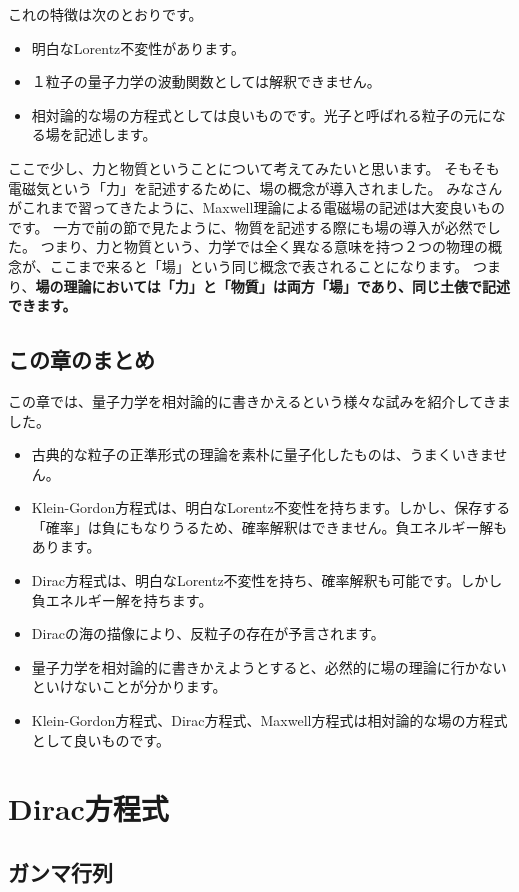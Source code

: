 \documentclass[report,paper=a4, fontsize=12pt, line_length=16cm, number_of_lines=33,dvipdfmx]{jlreq}
\numberwithin{equation}{chapter}
\newcommand{\strong}[1]{{\sffamily \bfseries #1}}
\begin{document}
これの特徴は次のとおりです。
\begin{itemize}
  \item 明白なLorentz不変性があります。
  \item １粒子の量子力学の波動関数としては解釈できません。
  \item 相対論的な場の方程式としては良いものです。光子と呼ばれる粒子の元になる場を記述します。
\end{itemize}

ここで少し、力と物質ということについて考えてみたいと思います。
そもそも電磁気という「力」を記述するために、場の概念が導入されました。
みなさんがこれまで習ってきたように、Maxwell理論による電磁場の記述は大変良いものです。
一方で前の節で見たように、物質を記述する際にも場の導入が必然でした。
つまり、力と物質という、力学では全く異なる意味を持つ２つの物理の概念が、ここまで来ると「場」という同じ概念で表されることになります。
つまり、\strong{場の理論においては「力」と「物質」は両方「場」であり、同じ土俵で記述できます。}


\section{この章のまとめ}
この章では、量子力学を相対論的に書きかえるという様々な試みを紹介してきました。
\begin{itemize}
  \item 古典的な粒子の正準形式の理論を素朴に量子化したものは、うまくいきません。
  \item Klein-Gordon方程式は、明白なLorentz不変性を持ちます。しかし、保存する「確率」は負にもなりうるため、確率解釈はできません。負エネルギー解もあります。
  \item Dirac方程式は、明白なLorentz不変性を持ち、確率解釈も可能です。しかし負エネルギー解を持ちます。
  \item Diracの海の描像により、反粒子の存在が予言されます。
  \item 量子力学を相対論的に書きかえようとすると、必然的に場の理論に行かないといけないことが分かります。
  \item Klein-Gordon方程式、Dirac方程式、Maxwell方程式は相対論的な場の方程式として良いものです。
\end{itemize}

\chapter{Dirac方程式}
\section{ガンマ行列}
\end{document}
